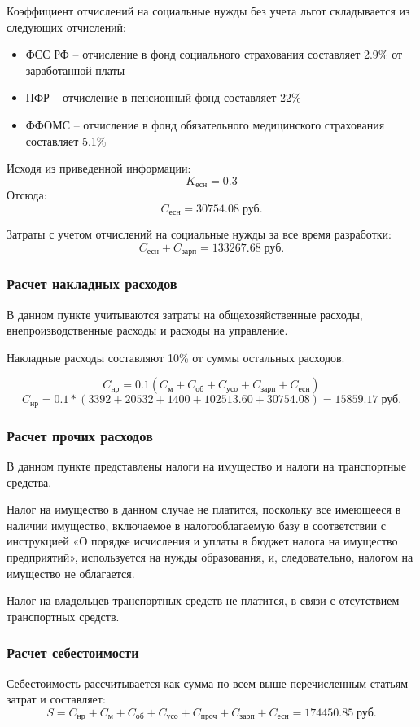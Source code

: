 \documentclass[russian,utf8,emptystyle]{eskdtext}
\begin{document}
\begin{spacing}{1.5}
Коэффициент отчислений на социальные нужды без учета льгот складывается из следующих отчислений:
\begin{itemize}
\item ФСС РФ -- отчисление в фонд социального страхования составляет 2.9\% от заработанной платы
\item ПФР -- отчисление в пенсионный фонд составляет 22\%
\item ФФОМС -- отчисление в фонд обязательного медицинского страхования составляет 5.1\%
\end{itemize}

Исходя из приведенной информации:
$$
K_\text{есн} = 0.3
$$
Отсюда:
$$
C_\text{есн} = 30754.08 \; \text{руб.}
$$

Затраты с учетом отчислений на социальные нужды за все время разработки:
$$
C_\text{есн} + C_\text{зарп} = 133267.68 \; \text{руб.}
$$

\subsubsection{Расчет накладных расходов}

В данном пункте учитываются затраты на общехозяйственные расходы, внепроизводственные расходы и расходы на управление.

Накладные расходы составляют 10\% от суммы остальных расходов.

$$
C_\text{нр} = 0.1(C_\text{м} + C_\text{об} + C_\text{усо} + C_\text{зарп} + C_\text{есн}) 
$$
$$
C_\text{нр} = 0.1*(3392 + 20532 + 1400 + 102513.60 + 30754.08) = 15859.17 \; \text{руб.}
$$

\subsubsection{Расчет прочих расходов}
В данном пункте представлены налоги на имущество и налоги на транспортные средства.

Налог на имущество в данном случае не платится, поскольку все имеющееся в наличии имущество, включаемое в налогооблагаемую базу в соответствии с инструкцией «О порядке исчисления и уплаты в бюджет налога на имущество предприятий», используется на нужды образования, и, следовательно, налогом на имущество не облагается.

Налог на владельцев транспортных средств не платится, в связи с отсутствием транспортных средств. 

\subsubsection{Расчет себестоимости}
Себестоимость рассчитывается как сумма по всем выше перечисленным статьям затрат и составляет:
$$
S = C_\text{нр} + C_\text{м} + C_\text{об} + C_\text{усо} + C_\text{проч} + C_\text{зарп} + C_\text{есн} = 174450.85 \; \text{руб.}
$$


\end{spacing}
\end{document}
